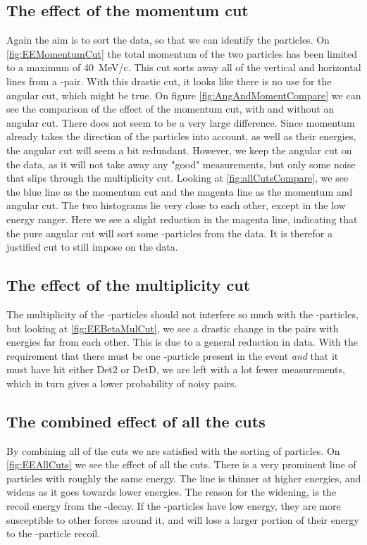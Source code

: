\subsection{The effect of the momentum cut}
Again the aim is to sort the data, so that we can identify the particles. On \cref{fig:EEMomentumCut} the total momentum of the two particles has been limited to a maximum of \SI{40}{MeV/c}. This cut sorts away all of the vertical and horizontal lines from a \be-\al pair. With this drastic cut, it looks like there is no use for the angular cut, which might be true. On figure \ref{fig:AngAndMomentCompare} we can see the comparison of the effect of the momentum cut, with and without an angular cut. There does not seem to be a very large difference. Since momentum already takes the direction of the particles into account, as well as their energies, the angular cut will seem a bit redundant. However, we keep the angular cut on the data, as it will not take away any "good" measurements, but only some noise that slips through the multiplicity cut. Looking at \cref{fig:allCutsCompare}, we see the blue line as the momentum cut and the magenta line as the momentum and angular cut. The two histograms lie very close to each other, except in the low energy ranger. Here we see a slight reduction in the magenta line, indicating that the pure angular cut will sort some \be-particles from the data. It is therefor a justified cut to still impose on the data. 
 


\subsection{The effect of the multiplicity cut}
The multiplicity of the \be-particles should not interfere so much with the \al-particles, but looking at \cref{fig:EEBetaMulCut}, we see a drastic change in the pairs with energies far from each other. This is due to a general reduction in data. With the requirement that there must be one \be-particle present in the event \textit{and} that it must have hit either Det2 or DetD, we are left with a lot fewer measurements, which in turn gives a lower probability of noisy pairs. 

\subsection{The combined effect of all the cuts}
By combining all of the cuts we are satisfied with the sorting of particles. 
On \cref{fig:EEAllCuts} we see the effect of all the cuts.
There is a very prominent line of particles with roughly the same energy. 
The line is thinner at higher energies, and widens as it goes towards lower energies. 
The reason for the widening, is the recoil energy from the \be-decay.
If the \al-particles have low energy, they are more susceptible to other forces around it, and will lose a larger portion of their energy to the \be-particle recoil. \\

